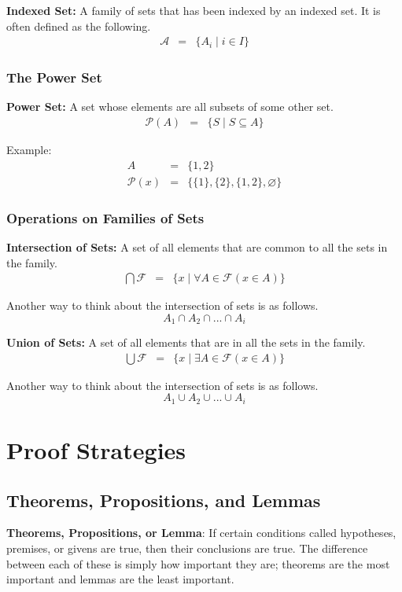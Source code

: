 \documentclass{article}
\begin{document}
\noindent \textbf{Indexed Set:} A family of sets that has been indexed by an indexed set.
It is often defined as the following.
\begin{eqnarray}
    \mathcal{A} &=& \{A_i \; | \; i \in I\}
\end{eqnarray}

\subsubsection{The Power Set}
\textbf{Power Set:} A set whose elements are all subsets of some other set.
\begin{eqnarray}
    \mathcal{P}(A) &=& \{ S \; | \; S \subseteq  A \}
\end{eqnarray}

\noindent Example:
\begin{eqnarray} \nonumber
    A &=& \{ 1, 2 \} \\ \nonumber
    \mathcal{P}(x) &=& \{ \{1\}, \{2\}, \{1, 2\}, \varnothing \}
\end{eqnarray}

\subsubsection{Operations on Families of Sets}
\textbf{Intersection of Sets:} A set of all elements that are common to all the sets
in the family.
\begin{eqnarray}
    \bigcap \mathcal{F} &=& \{ x \; | \; \forall A \in \mathcal{F}(x \in A) \}
\end{eqnarray}

\noindent Another way to think about the intersection of sets is as follows.
\[ A_1 \cap A_2 \cap ... \cap A_i \]

\noindent \textbf{Union of Sets:} A set of all elements that are in all the sets
in the family.
\begin{eqnarray}
    \bigcup \mathcal{F} &=& \{ x \; | \; \exists A \in \mathcal{F}(x \in A) \}
\end{eqnarray}

\noindent Another way to think about the intersection of sets is as follows.
\[ A_1 \cup A_2 \cup ... \cup A_i \]

\section{Proof Strategies}
\subsection{Theorems, Propositions, and Lemmas}
\textbf{Theorems, Propositions, or Lemma}: If certain conditions called hypotheses,
premises, or givens are true, then their conclusions are true. The difference between
each of these is simply how important they are; theorems are the most important and 
lemmas are the least important. \\
\end{document}
